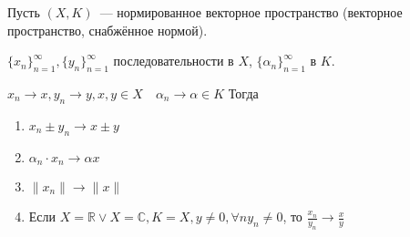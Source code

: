 \documentclass{book}
\newcommand\R{\ensuremath{\mathbb{R}}}
\renewcommand\C{\ensuremath{\mathbb{C}}}
\theoremstyle{definition}
\begin{document}
    \begin{theorem}
        Пусть $(X,K)$~--- нормированное векторное пространство (векторное пространство, снабжённое нормой).

        $\{x_n\}_{n=1}^{\infty }, \{y_n\}_{n=1}^{\infty }$ последовательности в $X$, $\{\alpha_n\}_{n=1}^{\infty }$ в $K$.

        $x_{n} \to x, y_{n} \to y, x, y\in X\quad \alpha_n\to \alpha\in K$
        Тогда 
        \begin{enumerate}
            \item $x_{n} \pm y_{n} \to  x\pm y$
            \item $\alpha_n\cdot x_n \to \alpha x$
            \item $\|x_n\| \to  \|x\|$
            \item Если $X = \R \lor X = \C, K=X, y\neq 0, \forall n y_{n} \neq 0$, то $\frac{x_{n} }{y_{n} } \to \frac{x}{y}$
        \end{enumerate}
    \end{theorem}
\end{document}
